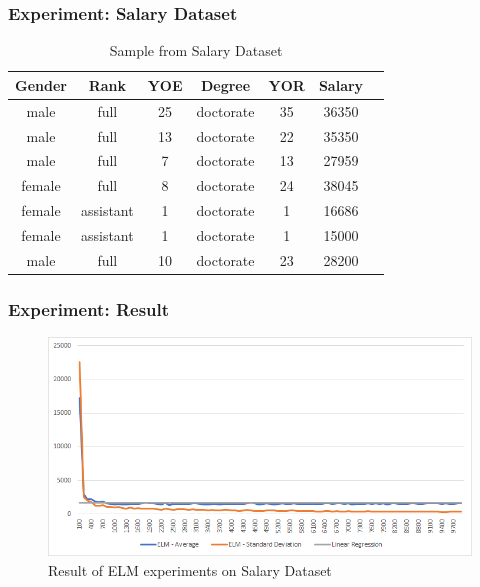 \documentclass{beamer}
\begin{document}
\begin{frame}
    \frametitle{Experiment: Salary Dataset}
    \begin{table}[H]
        \begin{center}
            \caption{Sample from Salary Dataset}
            \begin{tabular}{c c c c c c c }
                Gender & Rank & YOE & Degree & YOR & Salary\\\hline
                male & full & 25 & doctorate & 35 & 36350 \\ 
                male & full & 13 & doctorate & 22 & 35350\\ 
                male & full & 7 & doctorate & 13 & 27959\\ 
                female & full & 8 & doctorate & 24 & 38045\\ 
                female & assistant & 1 & doctorate & 1 & 16686\\ 
                female & assistant & 1 & doctorate & 1 & 15000\\ 
                male & full & 10 & doctorate & 23 & 28200\\ 
                
            \end{tabular}
            \label{tab:sample}
        \end{center}
    \end{table}
\end{frame}
\begin{frame}
    \frametitle{Experiment: Result}
    \begin{figure}[H]
        \begin{center}
            \includegraphics [width=\textwidth] {result}
        \end{center}
        \caption{Result of ELM experiments on Salary Dataset} 
        \label{fig:plot_result}       
    \end{figure}
\end{frame}
\end{document}
